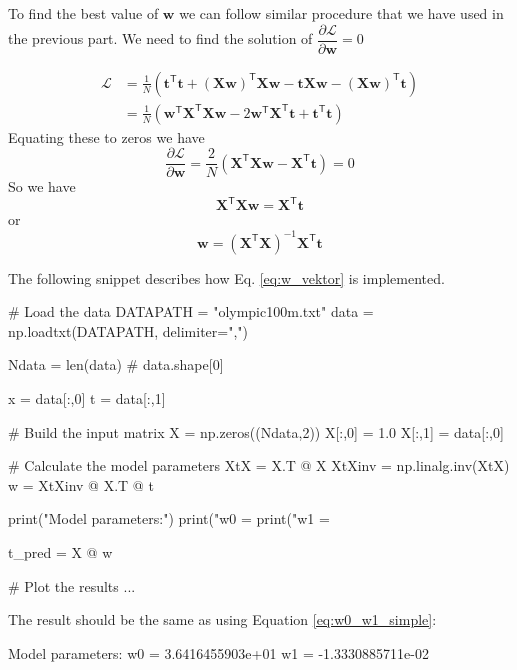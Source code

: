 To find the best value of $\mathbf{w}$ we can follow similar procedure that we have used
in the previous part. We need to find the solution of
$\dfrac{\partial \mathcal{L}}{\partial \mathbf{w}} = 0$

\begin{align}
\mathcal{L} & = \frac{1}{N} \left(
\mathbf{t}^{\mathsf{T}} \mathbf{t} +
\left(\mathbf{Xw}\right)^{\mathsf{T}} \mathbf{Xw} -
\mathbf{t}\mathbf{Xw} -
\left(\mathbf{Xw}\right)^{\mathsf{T}} \mathbf{t}
\right) \\
& = \frac{1}{N} \left(
\mathbf{w}^{\mathsf{T}} \mathbf{X}^{\mathsf{T}} \mathbf{X} \mathbf{w} -
2 \mathbf{w}^{\mathsf{T}} \mathbf{X}^{\mathsf{T}}\mathbf{t} +
\mathbf{t}^{\mathsf{T}} \mathbf{t}
\right)
\end{align}
Equating these to zeros we have
\begin{equation}
\frac{\partial \mathcal{L}}{\partial \mathbf{w}} =
\frac{2}{N} \left( \mathbf{X}^{\mathsf{T}} \mathbf{Xw} - \mathbf{X}^{\mathsf{T}}\mathbf{t} \right) = 0
\end{equation}
So we have
\begin{equation}
\mathbf{X}^{\mathsf{T}} \mathbf{Xw} = \mathbf{X}^{\mathsf{T}} \mathbf{t}
\end{equation}
or
\begin{equation}
\mathbf{w} = \left(\mathbf{X}^{\mathsf{T}}\mathbf{X} \right)^{-1} \mathbf{X}^{\mathsf{T}} \mathbf{t}
\label{eq:w_vektor}
\end{equation}

The following snippet describes how Eq. \eqref{eq:w_vektor} is implemented.
\begin{pythoncode}
# Load the data
DATAPATH = "olympic100m.txt"
data = np.loadtxt(DATAPATH, delimiter=",")
  
Ndata = len(data) # data.shape[0]
  
x = data[:,0]
t = data[:,1]
  
# Build the input matrix
X = np.zeros((Ndata,2))
X[:,0] = 1.0
X[:,1] = data[:,0]
  
# Calculate the model parameters
XtX = X.T @ X
XtXinv = np.linalg.inv(XtX)
w = XtXinv @ X.T @ t
  
print("Model parameters:")
print("w0 = %
print("w1 = %
  
t_pred = X @ w

# Plot the results ...
\end{pythoncode}

The result should be the same as using Equation \eqref{eq:w0_w1_simple}:
\begin{textcode}
Model parameters:
w0 =   3.6416455903e+01
w1 =  -1.3330885711e-02  
\end{textcode}


